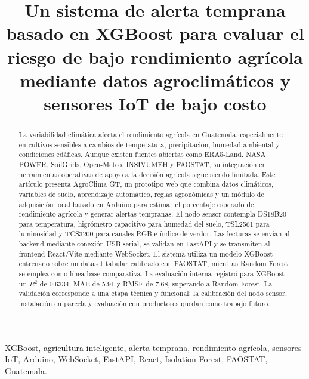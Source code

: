 \documentclass[conference,a4paper]{IEEEtran}
\begin{document}
\title{Un sistema de alerta temprana basado en XGBoost para evaluar el riesgo de bajo rendimiento agrícola mediante datos agroclimáticos y sensores IoT de bajo costo}

\author{
}

\maketitle

\begin{abstract}
La variabilidad climática afecta el rendimiento agrícola en Guatemala, especialmente en cultivos sensibles a cambios de temperatura, precipitación, humedad ambiental y condiciones edáficas. Aunque existen fuentes abiertas como ERA5-Land, NASA POWER, SoilGrids, Open-Meteo, INSIVUMEH y FAOSTAT, su integración en herramientas operativas de apoyo a la decisión agrícola sigue siendo limitada. Este artículo presenta AgroClima GT, un prototipo web que combina datos climáticos, variables de suelo, aprendizaje automático, reglas agronómicas y un módulo de adquisición local basado en Arduino para estimar el porcentaje esperado de rendimiento agrícola y generar alertas tempranas. El nodo sensor contempla DS18B20 para temperatura, higrómetro capacitivo para humedad del suelo, TSL2561 para luminosidad y TCS3200 para canales RGB e índice de verdor. Las lecturas se envían al backend mediante conexión USB serial, se validan en FastAPI y se transmiten al frontend React/Vite mediante WebSocket. El sistema utiliza un modelo XGBoost entrenado sobre un dataset tabular calibrado con FAOSTAT, mientras Random Forest se emplea como línea base comparativa. La evaluación interna registró para XGBoost un $R^2$ de 0.6334, MAE de 5.91 y RMSE de 7.68, superando a Random Forest. La validación corresponde a una etapa técnica y funcional; la calibración del nodo sensor, instalación en parcela y evaluación con productores quedan como trabajo futuro.
\end{abstract}

\begin{IEEEkeywords}
XGBoost, agricultura inteligente, alerta temprana, rendimiento agrícola, sensores IoT, Arduino, WebSocket, FastAPI, React, Isolation Forest, FAOSTAT, Guatemala.
\end{IEEEkeywords}
\end{document}
